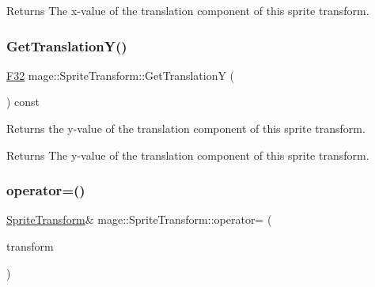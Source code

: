 \begin{DoxyReturn}{Returns}
The x-\/value of the translation component of this sprite transform. 
\end{DoxyReturn}
\hypertarget{structmage_1_1_sprite_transform_a45ac68b47fb751b8c3908524177c37c8}{}\label{structmage_1_1_sprite_transform_a45ac68b47fb751b8c3908524177c37c8} 
\subsubsection{\texorpdfstring{Get\+Translation\+Y()}{GetTranslationY()}}
{\footnotesize\ttfamily \hyperlink{namespacemage_aa97e833b45f06d60a0a9c4fc22ae02c0}{F32} mage\+::\+Sprite\+Transform\+::\+Get\+TranslationY (\begin{DoxyParamCaption}{ }\end{DoxyParamCaption}) const\hspace{0.3cm}{\ttfamily [noexcept]}}

Returns the y-\/value of the translation component of this sprite transform.

\begin{DoxyReturn}{Returns}
The y-\/value of the translation component of this sprite transform. 
\end{DoxyReturn}
\hypertarget{structmage_1_1_sprite_transform_af0adccff92d48e7b347e66277981ee07}{}\label{structmage_1_1_sprite_transform_af0adccff92d48e7b347e66277981ee07} 
\subsubsection{\texorpdfstring{operator=()}{operator=()}\hspace{0.1cm}{\footnotesize\ttfamily [1/2]}}
{\footnotesize\ttfamily \hyperlink{structmage_1_1_sprite_transform}{Sprite\+Transform}\& mage\+::\+Sprite\+Transform\+::operator= (\begin{DoxyParamCaption}\item[{const \hyperlink{structmage_1_1_sprite_transform}{Sprite\+Transform} \&}]{transform }\end{DoxyParamCaption})\hspace{0.3cm}{\ttfamily [default]}}

